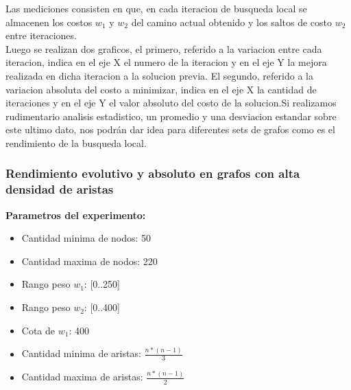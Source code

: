 Las mediciones consisten en que, en cada iteracion de busqueda local se almacenen los costos $w_1$ y $w_2$ del camino actual obtenido y los saltos de costo $w_2$ entre iteraciones.\\

Luego se realizan dos graficos, el primero, referido a la variacion entre cada iteracion, indica en el eje X el numero de la iteracion y en el eje Y la mejora realizada en dicha iteracion a la solucion previa. El segundo, referido a la variacion absoluta del costo a minimizar, indica en el eje X la cantidad de iteraciones y en el eje Y el valor absoluto del costo de la solucion.Si realizamos rudimentario analisis estadistico, un promedio y una desviacion estandar sobre este ultimo dato, nos podr\'an dar idea para diferentes sets de grafos como es el rendimiento de la busqueda local.

\subsubsection{Rendimiento evolutivo y absoluto en grafos con alta densidad de aristas}

\textbf{Parametros del experimento:}
\begin{itemize}
	\item Cantidad minima de nodos: 50
	\item Cantidad maxima de nodos: 220
	\item Rango peso $w_1$: [0..250]
	\item Rango peso $w_2$: [0..400]
	\item Cota de $w_1$: 400
	\item Cantidad minima de aristas: $\frac{n * (n-1)}{3}$
	\item Cantidad maxima de aristas: $\frac{n * (n-1)}{2}$
\end{itemize}  

\vspace{1cm}

